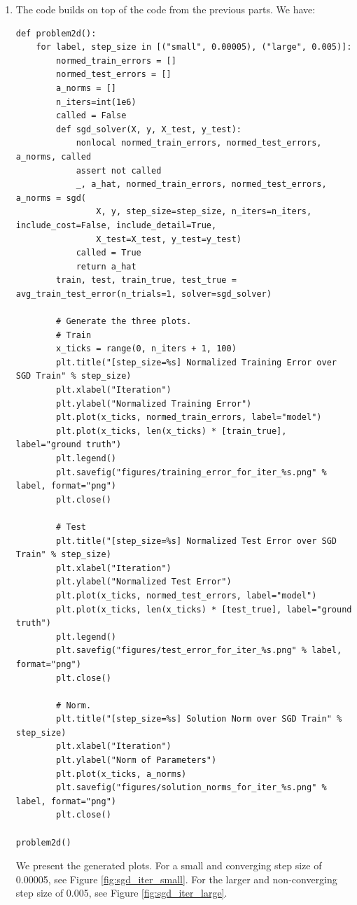 \documentclass[12pt]{article}
\begin{document}
\begin{enumerate}[label=(\alph*)]
    \item
      The code builds on top of the code from the previous parts. We have:
    \begin{verbatim}
def problem2d():
    for label, step_size in [("small", 0.00005), ("large", 0.005)]:
        normed_train_errors = []
        normed_test_errors = []
        a_norms = []
        n_iters=int(1e6)
        called = False
        def sgd_solver(X, y, X_test, y_test):
            nonlocal normed_train_errors, normed_test_errors, a_norms, called
            assert not called
            _, a_hat, normed_train_errors, normed_test_errors, a_norms = sgd(
                X, y, step_size=step_size, n_iters=n_iters, include_cost=False, include_detail=True,
                X_test=X_test, y_test=y_test)
            called = True
            return a_hat
        train, test, train_true, test_true = avg_train_test_error(n_trials=1, solver=sgd_solver)
        
        # Generate the three plots.
        # Train
        x_ticks = range(0, n_iters + 1, 100)
        plt.title("[step_size=%s] Normalized Training Error over SGD Train" % step_size)
        plt.xlabel("Iteration")
        plt.ylabel("Normalized Training Error")
        plt.plot(x_ticks, normed_train_errors, label="model")
        plt.plot(x_ticks, len(x_ticks) * [train_true], label="ground truth")
        plt.legend()
        plt.savefig("figures/training_error_for_iter_%s.png" % label, format="png")
        plt.close()
        
        # Test
        plt.title("[step_size=%s] Normalized Test Error over SGD Train" % step_size)
        plt.xlabel("Iteration")
        plt.ylabel("Normalized Test Error")
        plt.plot(x_ticks, normed_test_errors, label="model")
        plt.plot(x_ticks, len(x_ticks) * [test_true], label="ground truth")
        plt.legend()
        plt.savefig("figures/test_error_for_iter_%s.png" % label, format="png")
        plt.close()
        
        # Norm.
        plt.title("[step_size=%s] Solution Norm over SGD Train" % step_size)
        plt.xlabel("Iteration")
        plt.ylabel("Norm of Parameters")
        plt.plot(x_ticks, a_norms)
        plt.savefig("figures/solution_norms_for_iter_%s.png" % label, format="png")
        plt.close()

problem2d()
    \end{verbatim}

    We present the generated plots. For a small and converging step size of 0.00005, see Figure \ref{fig:sgd_iter_small}. For the larger and non-converging step size of 0.005, see Figure \ref{fig:sgd_iter_large}.


\end{enumerate}
\end{document}
